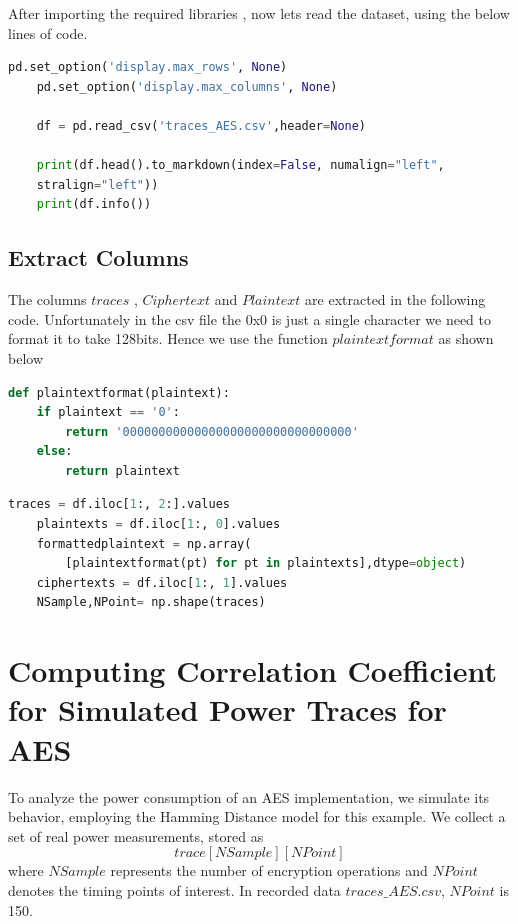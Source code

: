 \documentclass[12pt, letterpaper, oneside]{report}
\begin{document}
After importing the required libraries , now lets read the dataset, using the below lines of code.\\


\begin{lstlisting}[language=Python, caption=Reading the dataset]
    pd.set_option('display.max_rows', None)
    pd.set_option('display.max_columns', None)
    
    df = pd.read_csv('traces_AES.csv',header=None)
    
    print(df.head().to_markdown(index=False, numalign="left",
    stralign="left"))
    print(df.info())
\end{lstlisting}

\section{Extract Columns}

The columns $traces$ , $Ciphertext$ and $Plaintext$ are extracted in the following code. Unfortunately in the csv file the 0x0 is just a single character we need to format it to take 128bits. Hence we use the function $plaintextformat$ as shown below \\


\begin{lstlisting}[language=Python, caption=Normalising the data]
    def plaintextformat(plaintext):
    if plaintext == '0':
        return '00000000000000000000000000000000'
    else:
        return plaintext
\end{lstlisting} 


\begin{lstlisting}[language=Python, caption=Extracting Columns]
    traces = df.iloc[1:, 2:].values
    plaintexts = df.iloc[1:, 0].values
    formattedplaintext = np.array(
        [plaintextformat(pt) for pt in plaintexts],dtype=object)
    ciphertexts = df.iloc[1:, 1].values
    NSample,NPoint= np.shape(traces)
\end{lstlisting} 

\chapter{Computing Correlation Coeﬃcient for Simulated Power Traces for AES}

To analyze the power consumption of an AES implementation, we simulate its behavior, employing the Hamming Distance model for this example. We collect a set of real power measurements, stored as $$trace[NSample][NPoint]$$ where $NSample$ represents the number of encryption operations and $NPoint$ denotes the timing points of interest. In recorded data $traces\_AES.csv$, $NPoint$ is 150.\\
\end{document}
